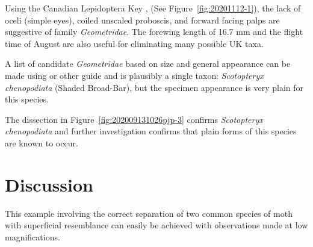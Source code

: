 \documentclass[]{article}
\begin{document}
Using the Canadian Lepidoptera Key , (See Figure~\ref{fig:20201112-1}), the lack of oceli (simple eyes), coiled unscaled proboscis, and forward facing palps are suggestive of family \textit{Geometridae}. The forewing length of 16.7 mm and the flight time of August are also useful for eliminating many possible UK taxa.

A list of candidate \textit{Geometridae} based on size and general appearance can be made using  \citet{Skinner1984} or other guide and is plausibly a single taxon: \textit{Scotopteryx chenopodiata} (Shaded Broad-Bar), but the specimen appearance is very plain for this species.

The dissection in Figure~\ref{fig:202009131026pjp-3}  confirms \textit{Scotopteryx chenopodiata} and further investigation confirms that plain forms of this species are known to occur.

\section*{Discussion}
This example involving the correct separation of two common species of moth with superficial resemblance can easily be achieved with observations made at low magnifications. 
\end{document}
